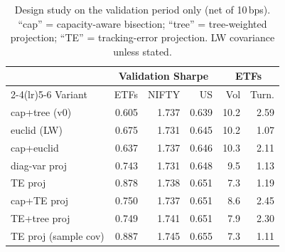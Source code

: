 \begin{table}[h]\centering\small
\caption{Design study on the validation period only (net of 10\,bps). ``cap'' = capacity-aware bisection; ``tree'' = tree-weighted projection; ``TE'' = tracking-error projection. LW covariance unless stated.}\label{tab:design}
\begin{tabular}{l rrr rr}\toprule
 & \multicolumn{3}{c}{Validation Sharpe} & \multicolumn{2}{c}{ETFs}\\
\cmidrule(lr){2-4}\cmidrule(lr){5-6}
Variant & ETFs & NIFTY & US & Vol & Turn.\\\midrule
cap+tree (v0) & 0.605 & 1.737 & 0.639 & 10.2 & 2.59\\
euclid (LW) & 0.675 & 1.731 & 0.645 & 10.2 & 1.07\\
cap+euclid & 0.637 & 1.737 & 0.646 & 10.3 & 2.11\\
diag-var proj & 0.743 & 1.731 & 0.648 & 9.5 & 1.13\\
TE proj & 0.878 & 1.738 & 0.651 & 7.3 & 1.19\\
cap+TE proj & 0.750 & 1.737 & 0.651 & 8.6 & 2.45\\
TE+tree proj & 0.749 & 1.741 & 0.651 & 7.9 & 2.30\\
TE proj (sample cov) & 0.887 & 1.745 & 0.655 & 7.3 & 1.11\\
\bottomrule\end{tabular}\end{table}